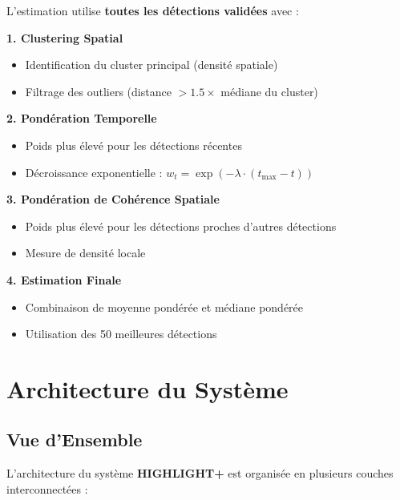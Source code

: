 \documentclass[12pt,a4paper]{article}
\newcommand{\highlight}{\textbf{HIGHLIGHT+}}
\begin{document}
L'estimation utilise \textbf{toutes les détections validées} avec :

\textbf{1. Clustering Spatial}
\begin{itemize}
    \item Identification du cluster principal (densité spatiale)
    \item Filtrage des outliers (distance $> 1.5 \times$ médiane du cluster)
\end{itemize}

\textbf{2. Pondération Temporelle}
\begin{itemize}
    \item Poids plus élevé pour les détections récentes
    \item Décroissance exponentielle : $w_t = \exp(-\lambda \cdot (t_{\max} - t))$
\end{itemize}

\textbf{3. Pondération de Cohérence Spatiale}
\begin{itemize}
    \item Poids plus élevé pour les détections proches d'autres détections
    \item Mesure de densité locale
\end{itemize}

\textbf{4. Estimation Finale}
\begin{itemize}
    \item Combinaison de moyenne pondérée et médiane pondérée
    \item Utilisation des 50 meilleures détections
\end{itemize}

\section{Architecture du Système}

\subsection{Vue d'Ensemble}

L'architecture du système \highlight{} est organisée en plusieurs couches interconnectées :
\end{document}
